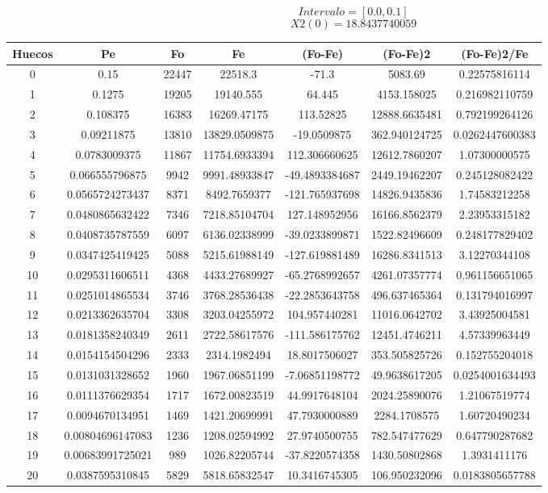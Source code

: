 \documentclass{article}
\begin{document}
$$
Intervalo = [0.0, 0.1]
$$
$$
X2(0) = 18.8437740059
$$
\begin{tabular}{|c|c|c|c|c|c|c|}
Huecos&Pe&Fo&Fe&(Fo{-}Fe)&(Fo{-}Fe)2&(Fo{-}Fe)2/Fe\\
\hline
0&0.15&22447&22518.3&{-}71.3&5083.69&0.22575816114\\
\hline
1&0.1275&19205&19140.555&64.445&4153.158025&0.216982110759\\
\hline
2&0.108375&16383&16269.47175&113.52825&12888.6635481&0.792199264126\\
\hline
3&0.09211875&13810&13829.0509875&{-}19.0509875&362.940124725&0.0262447600383\\
\hline
4&0.0783009375&11867&11754.6933394&112.306660625&12612.7860207&1.07300000575\\
\hline
5&0.066555796875&9942&9991.48933847&{-}49.4893384687&2449.19462207&0.245128082422\\
\hline
6&0.0565724273437&8371&8492.7659377&{-}121.765937698&14826.9435836&1.74583212258\\
\hline
7&0.0480865632422&7346&7218.85104704&127.148952956&16166.8562379&2.23953315182\\
\hline
8&0.0408735787559&6097&6136.02338999&{-}39.0233899871&1522.82496609&0.248177829402\\
\hline
9&0.0347425419425&5088&5215.61988149&{-}127.619881489&16286.8341513&3.12270344108\\
\hline
10&0.0295311606511&4368&4433.27689927&{-}65.2768992657&4261.07357774&0.961156651065\\
\hline
11&0.0251014865534&3746&3768.28536438&{-}22.2853643758&496.637465364&0.131794016997\\
\hline
12&0.0213362635704&3308&3203.04255972&104.957440281&11016.0642702&3.43925004581\\
\hline
13&0.0181358240349&2611&2722.58617576&{-}111.586175762&12451.4746211&4.57339963449\\
\hline
14&0.0154154504296&2333&2314.1982494&18.8017506027&353.505825726&0.152755204018\\
\hline
15&0.0131031328652&1960&1967.06851199&{-}7.06851198772&49.9638617205&0.0254001634493\\
\hline
16&0.0111376629354&1717&1672.00823519&44.9917648104&2024.25890076&1.21067519774\\
\hline
17&0.0094670134951&1469&1421.20699991&47.7930000889&2284.1708575&1.60720490234\\
\hline
18&0.00804696147083&1236&1208.02594992&27.9740500755&782.547477629&0.647790287682\\
\hline
19&0.00683991725021&989&1026.82205744&{-}37.8220574358&1430.50802868&1.3931411176\\
\hline
20&0.0387595310845&5829&5818.65832547&10.3416745305&106.950232096&0.0183805657788\\
\end{tabular}
\end{document}
